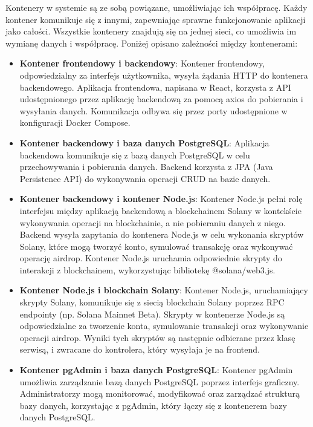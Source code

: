 Kontenery w systemie są ze sobą powiązane, umożliwiając ich współpracę. Każdy kontener komunikuje się z innymi, zapewniając sprawne funkcjonowanie aplikacji jako całości. Wszystkie kontenery znajdują się na jednej sieci, co umożliwia im wymianę danych i współpracę. Poniżej opisano zależności między kontenerami:

\begin{itemize}
    \item \textbf{Kontener frontendowy i backendowy}: Kontener frontendowy, odpowiedzialny za interfejs użytkownika, wysyła żądania HTTP do kontenera backendowego. Aplikacja frontendowa, napisana w React, korzysta z API udostępnionego przez aplikację backendową za pomocą axios do pobierania i wysyłania danych. Komunikacja odbywa się przez porty udostępnione w konfiguracji Docker Compose.
    \item \textbf{Kontener backendowy i baza danych PostgreSQL}: Aplikacja backendowa komunikuje się z bazą danych PostgreSQL w celu przechowywania i pobierania danych. Backend korzysta z JPA (Java Persistence API) do wykonywania operacji CRUD na bazie danych.
    \item \textbf{Kontener backendowy i kontener Node.js}: Kontener Node.js pełni rolę interfejsu między aplikacją backendową a blockchainem Solany w kontekście wykonywania operacji na blockchainie, a nie pobieraniu danych z niego. Backend wysyła zapytania do kontenera Node.js w celu wykonania skryptów Solany, które mogą tworzyć konto, symulować transakcję oraz wykonywać operację airdrop. Kontener Node.js uruchamia odpowiednie skrypty do interakcji z blockchainem, wykorzystując bibliotekę @solana/web3.js.
    \item \textbf{Kontener Node.js i blockchain Solany}: Kontener Node.js, uruchamiający skrypty Solany, komunikuje się z siecią blockchain Solany poprzez RPC endpointy (np. Solana Mainnet Beta). Skrypty w kontenerze Node.js są odpowiedzialne za tworzenie konta, symulowanie transakcji oraz wykonywanie operacji airdrop. Wyniki tych skryptów są następnie odbierane przez klasę serwisą, i zwracane do kontrolera, który wysyłaja je na frontend.
    \item \textbf{Kontener pgAdmin i baza danych PostgreSQL}: Kontener pgAdmin umożliwia zarządzanie bazą danych PostgreSQL poprzez interfejs graficzny. Administratorzy mogą monitorować, modyfikować oraz zarządzać strukturą bazy danych, korzystając z pgAdmin, który łączy się z kontenerem bazy danych PostgreSQL.
\end{itemize}

